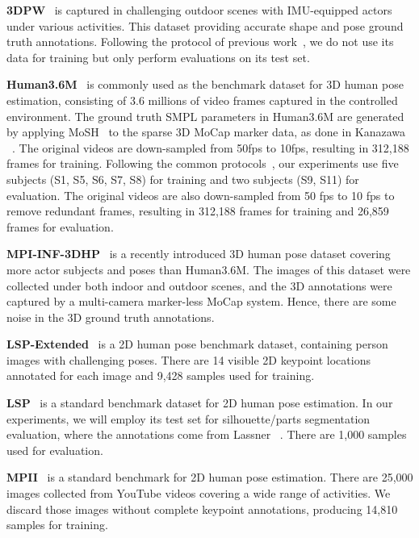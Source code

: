 \documentclass[10pt,twocolumn,letterpaper]{article}
\begin{document}
\textbf{3DPW}~\cite{von2018recovering} is captured in challenging outdoor scenes with IMU-equipped actors under various activities.
This dataset providing accurate shape and pose ground truth annotations.
Following the protocol of previous work~\cite{kanazawa2019learning,kolotouros2019learning}, we do not use its data for training but only  perform evaluations on its test set.


\textbf{Human3.6M}~\cite{ionescu2014human3} is commonly used as the benchmark dataset for 3D human pose estimation, consisting of 3.6 millions of video frames captured in the controlled environment.
The ground truth SMPL parameters in Human3.6M are generated by applying MoSH~\cite{loper2014mosh} to the sparse 3D MoCap marker data, as done in Kanazawa \etal~\cite{kanazawa2018end}.
The original videos are down-sampled from 50fps to 10fps, resulting in 312,188 frames for training.
Following the common protocols~\cite{pavlakos2017coarse,pavlakos2018learning,kanazawa2018end}, our experiments use five subjects (S1, S5, S6, S7, S8) for training and two subjects (S9, S11) for evaluation.
The original videos are also down-sampled from 50 fps to 10 fps to remove redundant frames, resulting in 312,188 frames for training and 26,859 frames for evaluation.

\textbf{MPI-INF-3DHP}~\cite{mehta2017monocular} is a recently introduced 3D human pose dataset covering more actor subjects and poses than Human3.6M.
The images of this dataset were collected under both indoor and outdoor scenes, and the 3D annotations were captured by a multi-camera marker-less MoCap system.
Hence, there are some noise in the 3D ground truth annotations.


\textbf{LSP-Extended}~\cite{johnson2011learning} is a 2D human pose benchmark dataset, containing person images with challenging poses. There are 14 visible 2D keypoint locations annotated for each image and 9,428 samples used for training.

\textbf{LSP}~\cite{johnson2010clustered} is a standard benchmark dataset for 2D human pose estimation. In our experiments, we will employ its test set for silhouette/parts segmentation evaluation, where the annotations come from Lassner \etal~\cite{lassner2017unite}.
There are 1,000 samples used for evaluation.

\textbf{MPII}~\cite{andriluka20142d} is a standard benchmark for 2D human pose estimation.
There are 25,000 images collected from YouTube videos covering a wide range of activities.
We discard those images without complete keypoint annotations, producing 14,810 samples for training.
\end{document}
